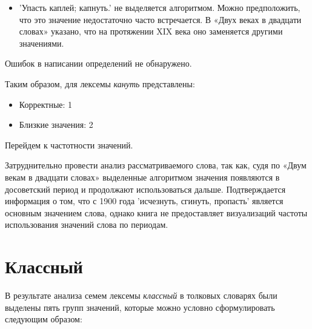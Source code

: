 \begin{itemize}
    \item ’Упасть каплей; капнуть.’ не выделяется алгоритмом.
Можно предположить, что это значение недостаточно часто встречается.
В «Двух веках в двадцати словах» указано, что на протяжении XIX века оно заменяется
другими значениями.
\end{itemize}

Ошибок в написании определений не обнаружено.

Таким образом, для лексемы \textit{кануть} представлены:

\begin{itemize}
    \item Корректные: 1
    \item Близкие значения: 2
\end{itemize}

Перейдем к частотности значений.

Затруднительно провести анализ рассматриваемого слова,
так как, судя по «Двум векам в двадцати словах» выделенные алгоритмом значения появляются
в досоветский период и продолжают использоваться дальше.
Подтверждается информация о том, что с 1900 года ’исчезнуть, сгинуть, пропасть’ является
основным значением слова, однако книга не предоставляет визуализаций частоты
использования значений слова по периодам.

\section*{Классный}

В результате анализа семем лексемы \textit{классный} в толковых словарях были выделены пять групп значений,
которые можно условно сформулировать следующим образом:

